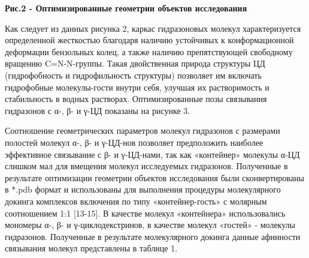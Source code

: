 {\bfseries Рис.2 - Оптимизированные геометрии объектов исследования}

Как следует из данных рисунка 2, каркас гидразоновых молекул
характеризуется определенной жесткостью благодаря наличию устойчивых к
конформационной деформации бензольных колец, а также наличию
препятствующей свободному вращению C=N-N-группы. Такая двойственная
природа структуры ЦД (гидрофобность и гидрофильность структуры)
позволяет им включать гидрофобные молекулы-гости внутри себя, улучшая их
растворимость и стабильность в водных растворах. Оптимизированные позы
связывания гидразонов с α-, β- и γ-ЦД показаны на рисунке 3.

Соотношение геометрических параметров молекул гидразонов с размерами
полостей молекул α-, β- и γ-ЦД-нов позволяет предположить наиболее
эффективное связывание с β- и γ-ЦД-нами, так как «контейнер» молекулы
α-ЦД слишком мал для вмещения молекул исследуемых гидразонов. Полученные
в результате оптимизации геометрии объектов исследования были
сконвертированы в *.pdb формат и использованы для выполнения процедуры
молекулярного докинга комплексов включения по типу «контейнер-гость» с
молярным соотношением 1:1 {[}13-15{]}. В качестве молекул «контейнера»
использовались мономеры α-, β- и γ-циклодекстринов, в качестве молекул
«гостей» - молекулы гидразонов. Полученные в результате молекулярного
докинга данные афинности связывания молекул представлены в таблице 1.

